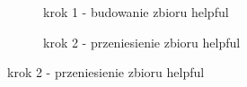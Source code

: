 \begin{figure}[h]
\begin{subfigure}{.5\textwidth}
    \centering
    \caption[short]{krok 1 - budowanie zbioru helpful}
\end{subfigure}
\begin{subfigure}{.5\textwidth}
    \centering
    \caption[short]{krok 2 - przeniesienie zbioru helpful}
\end{subfigure}%


\end{figure}
